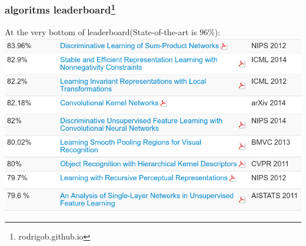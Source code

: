 \documentclass{beamer}
\begin{document}
\begin{frame}
\frametitle{algoritms leaderboard\footnote{rodrigob.github.io}}
At the very bottom of leaderboard(State-of-the-art is 96\%):
\includegraphics[width=\textwidth]{rank.png}
\end{frame}
\end{document}
